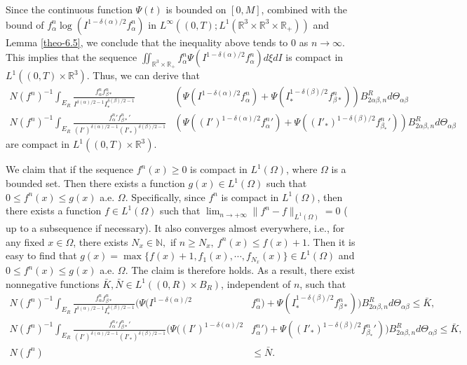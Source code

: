 \documentclass[reqno,11pt]{amsart}
\numberwithin{equation}{section}
\begin{document}
Since the continuous function $\Psi(t)$ is bounded on $[0, M]$, combined with the bound of $f^n_\alpha \log(I^{1-\delta(\alpha) / 2} f^n_\alpha)$ in $L^\infty((0,T); L^1(\mathbb{R}^3 \times \mathbb{R}^3 \times \mathbb{R}_+))$ and Lemma \ref{theo-6.5}, we conclude that the inequality above tends to $0$ as $n \to \infty$. This implies that the sequence $\iint_{\mathbb{R}^3 \times \mathbb{R}_+} f^n_\alpha \Psi(I^{1-\delta(\alpha) / 2}f^n_\alpha) d\xi dI$ is compact in $L^1((0,T) \times \mathbb{R}^3)$. Thus, we can derive that 
\begin{equation*}
	\begin{aligned}
	N(f^n)^{-1}	\int_{E_R}   \tfrac{f_\alpha^n f_{\beta *}^n}{ I^{\delta(\alpha) /2-1} I_*^{\delta(\beta)/2-1}} &(\Psi (I^{1-\delta(\alpha)/2} f_\alpha^n)+\Psi(I_*^{1-\delta(\beta) / 2} f_{\beta *}^n)) B^R_{2 \alpha \beta, n} d \Theta_{\alpha \beta}  	 \\
	N(f^n)^{-1}	\int_{E_R}   \tfrac{{f_\alpha^n}' {f_{\beta *}^n}'}{(I')^{\delta(\alpha)/2-1} (I'_*)^{\delta(\beta)/2-1 }} &(\Psi ((I')^{1-\delta(\alpha) / 2} {f_\alpha^n}' )+\Psi ((I'_*)^{1-\delta(\beta) / 2} {f_{\beta_*}^n}' )) B^R_{2 \alpha \beta, n} d \Theta_{\alpha \beta} 
	\end{aligned}
\end{equation*}
are compact in $L^1((0,T) \times \mathbb{R}^3)$.


 We claim that if the sequence $f^n(x)\geq 0 $ is compact in $L^1 (  \Omega )$, where $\Omega $ is a bounded set. Then there exists a function $g(x) \in L^1 (  \Omega )$ such that $ 0 \leq f^n ( x ) \leq g ( x ) $ a.e. $\Omega.$ Specifically, since $f^n$ is compact in $L^1 ( \Omega)$, then there exists a function $f \in L^1 ( \Omega ) $ such that $\lim_{n \to + \infty} \|f^n - f\|_{L^1 ( \Omega ) } =0$ ( up to a subsequence if necessary). It also converges almost everywhere, i.e., for any fixed $x \in \Omega$, there exists $N_x \in \mathbb{N},$ if $n \geq N_x, \ f^n (x ) \leq f( x ) + 1 $. Then it is easy to find that $g(x) = \max \{ f(x) +1 , f_1( x ) ,\cdots, f_{N_x} (x ) \} \in L^1 (  \Omega )$ and $ 0 \leq f^n ( x ) \leq g ( x ) $ a.e. $\Omega.$ The claim is therefore holds. As a result, there exist nonnegative functions $\bar{K}  ,\bar{N}  \in L^1 ((0,R) \times B_R )$, independent of $n$, such that 
\begin{equation*}
	\begin{aligned}
		N(f^n)^{-1}	\int_{E_R}   \tfrac{f_\alpha^n f_{\beta *}^n}{ I^{\delta(\alpha) /2-1} I_*^{\delta(\beta)/2-1}} (\Psi (I^{1-\delta(\alpha)/2}& f_\alpha^n)+\Psi(I_*^{1-\delta(\beta) / 2} f_{\beta *}^n)) B^R_{2 \alpha \beta, n} d \Theta_{\alpha \beta}   \leq  \bar{K}    , \\
		 N(f^n)^{-1}	\int_{E_R}   \tfrac{{f_\alpha^n}' {f_{\beta *}^n}'}{(I')^{\delta(\alpha)/2-1} (I'_*)^{\delta(\beta)/2-1 }} (\Psi ((I')^{1-\delta(\alpha) / 2}& {f_\alpha^n}' )+\Psi ((I'_*)^{1-\delta(\beta) / 2} {f_{\beta_*}^n}' )) B^R_{2 \alpha \beta, n} d \Theta_{\alpha \beta}  \leq  \bar{K},   \\
		 N ( f^n) &\leq \bar{N}.
	\end{aligned}
\end{equation*}
\end{document}
